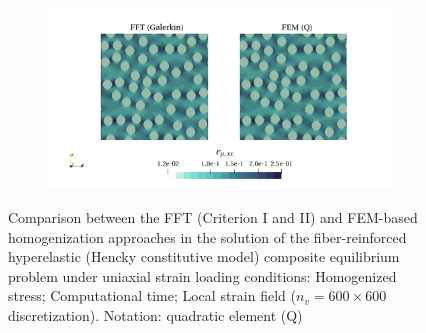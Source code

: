 \begin{figure}[hbt]
\begin{subfigure}[b]{0.49\textwidth}
    \caption{}
    \label{subfig:hencky_2D_normal_cpu_time_vs_n_voxels}
  \end{subfigure}
  \begin{subfigure}[b]{\textwidth}
    \centering
    \includegraphics[width=\textwidth]{figures/hencky_2D_normal_strain_11}
    \caption{}
    \label{subfig:hencky_2D_normal_strain_11}
  \end{subfigure}
  \caption{Comparison between the FFT (Criterion I and II) and FEM-based homogenization approaches in the
  solution of the fiber-reinforced hyperelastic (Hencky constitutive model) composite equilibrium problem under uniaxial strain loading conditions:
   Homogenized stress;
   Computational time;
   Local strain field (\(n_v = 600 \times 600\)
  discretization). Notation: quadratic element (Q)}
\label{fig:hencky_2D_normal}
\end{figure}

